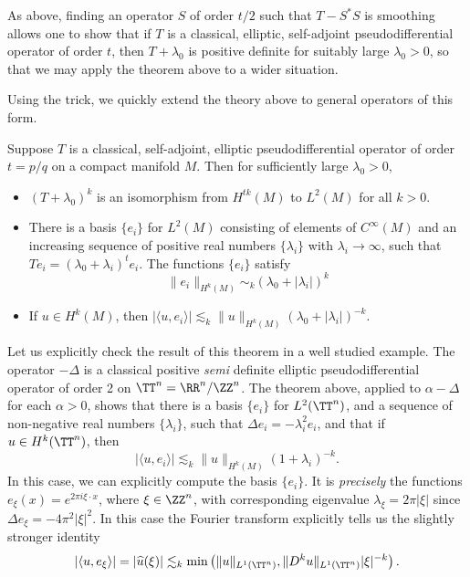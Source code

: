 \begin{remark}
    As above, finding an operator $S$ of order $t/2$ such that $T - S^*S$ is smoothing allows one to show that if $T$ is a classical, elliptic, self-adjoint pseudodifferential operator of order $t$, then $T + \lambda_0$ is positive definite for suitably large $\lambda_0 > 0$, so that we may apply the theorem above to a wider situation.
\end{remark}

Using the trick, we quickly extend the theory above to general operators of this form.

\begin{theorem}
    Suppose $T$ is a classical, self-adjoint, elliptic pseudodifferential operator of order $t = p/q$ on a compact manifold $M$. Then for sufficiently large $\lambda_0 > 0$,
    \begin{itemize}
        \item $(T + \lambda_0)^k$ is an isomorphism from $H^{tk}(M)$ to $L^2(M)$ for all $k > 0$.
        \item There is a basis $\{ e_i \}$ for $L^2(M)$ consisting of elements of $C^\infty(M)$ and an increasing sequence of positive real numbers $\{ \lambda_i \}$ with $\lambda_i \to \infty$, such that $Te_i = (\lambda_0 + \lambda_i)^t e_i$. The functions $\{ e_i \}$ satisfy
        \[ \| e_i \|_{H^k(M)} \sim_k (\lambda_0 + |\lambda_i|)^k \]
        \item If $u \in H^k(M)$, then $|\langle u, e_i \rangle| \lesssim_k \| u \|_{H^k(M)} (\lambda_0 + |\lambda_i|)^{-k}$.
    \end{itemize}
\end{theorem}

\begin{example}
    Let us explicitly check the result of this theorem in a well studied example. The operator $-\Delta$ is a classical positive \emph{semi} definite elliptic pseudodifferential operator of order 2 on $\TT^n = \RR^n / \ZZ^n$. The theorem above, applied to $\alpha - \Delta$ for each $\alpha > 0$, shows that there is a basis $\{ e_i \}$ for $L^2(\TT^n)$, and a sequence of non-negative real numbers $\{ \lambda_i \}$, such that $\Delta e_i = - \lambda_i^2 e_i$, and that if $u \in H^k(\TT^n)$, then
    \[ |\langle u, e_i \rangle| \lesssim_k \| u \|_{H^k(M)} (1 + \lambda_i)^{-k}. \]
    In this case, we can explicitly compute the basis $\{ e_i \}$. It is \emph{precisely} the functions $e_\xi(x) = e^{2 \pi i \xi \cdot x}$, where $\xi \in \ZZ^n$, with corresponding eigenvalue $\lambda_\xi = 2 \pi |\xi|$ since $\Delta e_\xi = -4 \pi^2 |\xi|^2$. In this case the Fourier transform explicitly tells us the slightly stronger identity
    \[ |\langle u, e_\xi \rangle| = |\widehat{u}(\xi)| \lesssim_k \min \left( \| u \|_{L^1(\TT^n)}, \| D^k u \|_{L^1(\TT^n)} |\xi|^{-k} \right). \]
\end{example}

